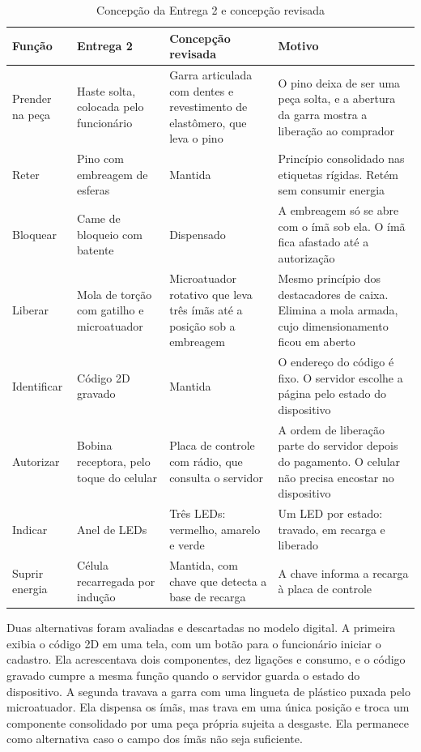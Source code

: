 \begin{table}[htbp]
    \centering
    \caption{Concepção da Entrega 2 e concepção revisada}
    \label{tab:conj_revisao}
    \footnotesize
    \renewcommand{\arraystretch}{1.3}
    \begin{tabularx}{\textwidth}{@{}
        >{\RaggedRight\arraybackslash}p{2.3cm}
        >{\RaggedRight\arraybackslash}p{3.6cm}
        >{\RaggedRight\arraybackslash}p{4.0cm}
        >{\RaggedRight\arraybackslash}X@{}}
        \toprule
        \textbf{Função} & \textbf{Entrega 2} & \textbf{Concepção revisada} & \textbf{Motivo} \\
        \midrule
        Prender na peça & Haste solta, colocada pelo funcionário & Garra articulada com dentes e revestimento de elastômero, que leva o pino & O pino deixa de ser uma peça solta, e a abertura da garra mostra a liberação ao comprador \\
        Reter & Pino com embreagem de esferas & Mantida & Princípio consolidado nas etiquetas rígidas. Retém sem consumir energia \\
        Bloquear & Came de bloqueio com batente & Dispensado & A embreagem só se abre com o ímã sob ela. O ímã fica afastado até a autorização \\
        Liberar & Mola de torção com gatilho e microatuador & Microatuador rotativo que leva três ímãs até a posição sob a embreagem & Mesmo princípio dos destacadores de caixa. Elimina a mola armada, cujo dimensionamento ficou em aberto \\
        Identificar & Código 2D gravado & Mantida & O endereço do código é fixo. O servidor escolhe a página pelo estado do dispositivo \\
        Autorizar & Bobina receptora, pelo toque do celular & Placa de controle com rádio, que consulta o servidor & A ordem de liberação parte do servidor depois do pagamento. O celular não precisa encostar no dispositivo \\
        Indicar & Anel de LEDs & Três LEDs: vermelho, amarelo e verde & Um LED por estado: travado, em recarga e liberado \\
        Suprir energia & Célula recarregada por indução & Mantida, com chave que detecta a base de recarga & A chave informa a recarga à placa de controle \\
        \bottomrule
    \end{tabularx}
\end{table}

Duas alternativas foram avaliadas e descartadas no modelo digital. A primeira exibia o código 2D em uma tela, com um botão para o funcionário iniciar o cadastro. Ela acrescentava dois componentes, dez ligações e consumo, e o código gravado cumpre a mesma função quando o servidor guarda o estado do dispositivo. A segunda travava a garra com uma lingueta de plástico puxada pelo microatuador. Ela dispensa os ímãs, mas trava em uma única posição e troca um componente consolidado por uma peça própria sujeita a desgaste. Ela permanece como alternativa caso o campo dos ímãs não seja suficiente.

